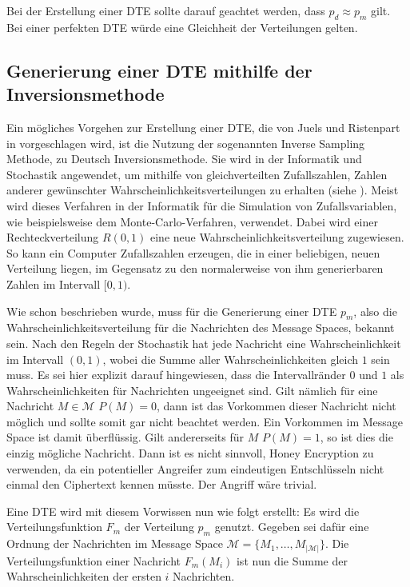 Bei der Erstellung einer DTE sollte darauf geachtet werden, dass $p_d \approx p_m$ gilt. Bei einer perfekten DTE würde eine Gleichheit der Verteilungen gelten.

\subsection{Generierung einer DTE mithilfe der Inversionsmethode}

Ein mögliches Vorgehen zur Erstellung einer DTE, die von Juels und Ristenpart in \cite{EURO2014} vorgeschlagen wird, ist die Nutzung der sogenannten Inverse Sampling Methode, zu Deutsch Inversionsmethode. Sie wird in der Informatik und Stochastik angewendet, um mithilfe von gleichverteilten Zufallszahlen, Zahlen anderer gewünschter Wahrscheinlichkeitsverteilungen zu erhalten (siehe \cite{Inversionsmethode}). Meist wird dieses Verfahren in der Informatik für die Simulation von Zufallsvariablen, wie beispielsweise dem Monte-Carlo-Verfahren, verwendet. Dabei wird einer Rechteckverteilung $R(0,1)$ eine neue Wahrscheinlichkeitsverteilung zugewiesen. So kann ein Computer Zufallszahlen erzeugen, die in einer beliebigen, neuen Verteilung liegen, im Gegensatz zu den normalerweise von ihm generierbaren Zahlen im Intervall $[0,1)$.

Wie schon beschrieben wurde, muss für die Generierung einer DTE $p_m$, also die Wahrscheinlichkeitsverteilung für die Nachrichten des Message Spaces, bekannt sein. Nach den Regeln der Stochastik hat jede Nachricht eine Wahrscheinlichkeit im Intervall $(0,1)$, wobei die Summe aller Wahrscheinlichkeiten gleich $1$ sein muss. Es sei hier explizit darauf hingewiesen, dass die Intervallränder $0$ und $1$ als Wahrscheinlichkeiten für Nachrichten ungeeignet sind. Gilt nämlich für eine Nachricht $M \in \mathcal{M}$ $P(M) = 0$, dann ist das Vorkommen dieser Nachricht nicht möglich und sollte somit gar nicht beachtet werden. Ein Vorkommen im Message Space ist damit überflüssig. Gilt andererseits für $M$ $P(M) = 1$, so ist dies die einzig mögliche Nachricht. Dann ist es nicht sinnvoll, Honey Encryption zu verwenden, da ein potentieller Angreifer zum eindeutigen Entschlüsseln nicht einmal den Ciphertext kennen müsste. Der Angriff wäre trivial.

Eine DTE wird mit diesem Vorwissen nun wie folgt erstellt: Es wird die Verteilungsfunktion $F_m$ der Verteilung $p_m$ genutzt. Gegeben sei dafür eine Ordnung der Nachrichten im Message Space $\mathcal{M} = \{M_1, \dots, M_{|\mathcal{M}|}\}$. Die Verteilungsfunktion einer Nachricht $F_m(M_i)$ ist nun die Summe der Wahrscheinlichkeiten der ersten $i$ Nachrichten.

